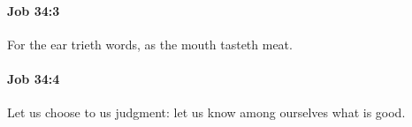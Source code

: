 		\paragraph{Job 34:3} %
			\label{JOB-34-3}

			For the ear trieth words, as the mouth tasteth meat.


		\paragraph{Job 34:4} %
			\label{JOB-34-4}

			Let us choose to us judgment: let us know among ourselves what is good.


